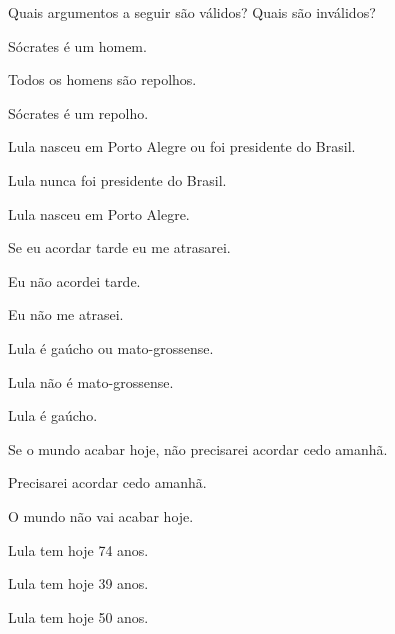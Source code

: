 \practiceproblems
\problempart
Quais argumentos a seguir são válidos? Quais são inválidos?

\begin{earg}
\item Sócrates é um homem.
\item Todos os homens são repolhos.
\item[\therefore] Sócrates é um repolho.
\end{earg}

\begin{earg}
\item  Lula nasceu em Porto Alegre ou foi presidente do Brasil.
\item Lula nunca foi presidente do Brasil.
\item[\therefore] Lula nasceu em Porto Alegre.
\end{earg}

\begin{earg}
\item Se eu acordar tarde eu me atrasarei.
\item Eu não acordei tarde.
\item[\therefore] Eu não me atrasei.
\end{earg}

\begin{earg}
\item Lula é gaúcho ou mato-grossense.
\item Lula não é mato-grossense.
\item[\therefore] Lula é gaúcho.
\end{earg}

\begin{earg}
\item Se o mundo acabar hoje, não precisarei acordar cedo amanhã.
\item Precisarei acordar cedo amanhã.
\item[\therefore] O mundo não vai acabar hoje.
\end{earg}

\begin{earg}
\item Lula tem hoje 74 anos.
\item Lula tem hoje 39 anos.
\item[\therefore] Lula tem hoje 50 anos.
\end{earg}

